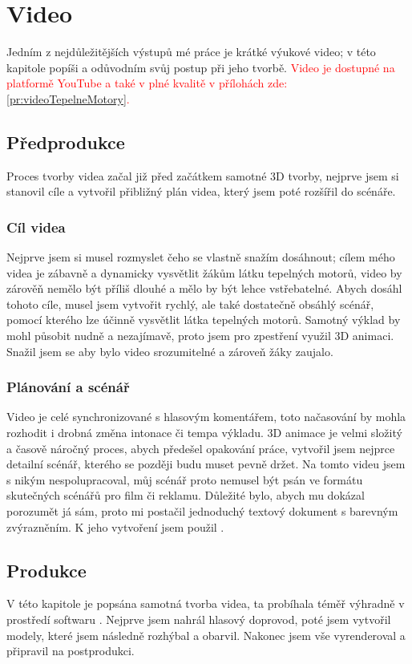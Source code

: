 \section{Video}
{Jedním z nejdůležitějších výstupů mé práce je krátké výukové video; v této kapitole popíši a odůvodním svůj postup při jeho tvorbě. \textcolor{red}{Video je dostupné na platformě YouTube a také v plné kvalitě v přílohách zde: \ref{pr:videoTepelneMotory}.}

\subsection{Předprodukce}
{Proces tvorby videa začal již před začátkem samotné 3D tvorby, nejprve jsem si stanovil cíle a vytvořil přibližný plán videa, který jsem poté rozšířil do scénáře.}\odst

\subsubsection{Cíl videa}
{Nejprve jsem si musel rozmyslet čeho se vlastně snažím dosáhnout; cílem mého videa je zábavně a dynamicky vysvětlit žákům látku tepelných motorů, video by zárověň nemělo být příliš dlouhé a mělo by být lehce vstřebatelné.}\odst
{Abych dosáhl tohoto cíle, musel jsem vytvořit rychlý, ale také dostatečně obsáhlý scénář, pomocí kterého lze účinně vysvětlit látka tepelných motorů. Samotný výklad by mohl působit nudně a nezajímavě, proto jsem pro zpestření využil 3D animaci. Snažil jsem se aby bylo video srozumitelné a zároveň žáky zaujalo.}

\subsubsection{Plánování a scénář}
{Video je celé synchronizované s hlasovým komentářem, toto načasování by mohla rozhodit i drobná změna intonace či tempa výkladu. 3D animace je velmi složitý a časově náročný proces, abych předešel opakování práce, vytvořil jsem nejprce detailní scénář, kterého se později budu muset pevně držet.}\odst
{Na tomto videu jsem s nikým nespolupracoval, můj scénář proto nemusel být psán ve formátu skutečných scénářů pro film či reklamu. Důležité bylo, abych mu dokázal porozumět já sám, proto mi postačil jednoduchý textový dokument s barevným zvýrazněním. K jeho vytvoření jsem použil .}

\newpage

\subsection{Produkce}
{V této kapitole je popsána samotná tvorba videa, ta probíhala téměř výhradně v prostředí softwaru . Nejprve jsem nahrál hlasový doprovod, poté jsem vytvořil modely, které jsem následně rozhýbal a obarvil. Nakonec jsem vše vyrenderoval a připravil na postprodukci.}

}
